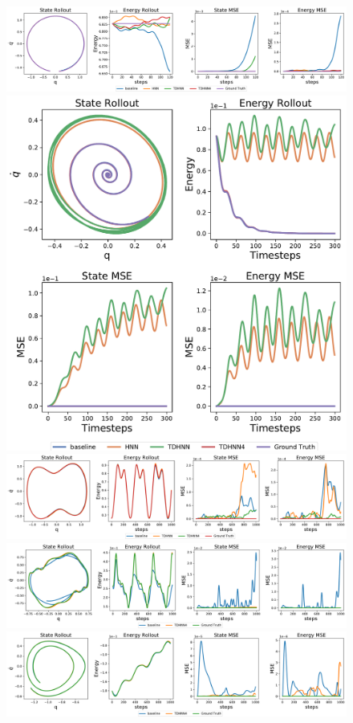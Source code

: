 \documentclass[twoside]{article}
\begin{document}
\begin{figure}[h!]
\centering
\includegraphics[width=.9\textwidth]{figures/mass_spring_long.pdf}
\includegraphics[width=.9\textwidth]{figures/damped_1_pred.pdf}
\includegraphics[width=.9\textwidth]{figures/mass_spring_forced_1_pred.pdf}
\includegraphics[width=.9\textwidth]{figures/mass_spring_forced_2_pred.pdf}
\includegraphics[width=.9\textwidth]{figures/duffing_1_pred.pdf}

\end{figure}
\end{document}
